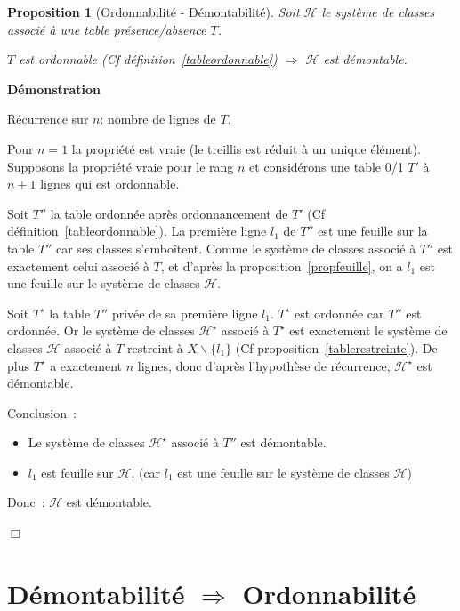 \documentclass[a4paper]{report}
\renewcommand{\textbf}[1]{\begingroup\bfseries\mathversion{bold}#1\endgroup}
\newtheorem{proposition}{Proposition}[chapter]
\newenvironment{preuve}{\textbf{Démonstration}}{}
\begin{document}
\label{sens2}


\begin{proposition}[Ordonnabilité - Démontabilité]

\label{tabletreillis}
Soit $\mathcal{H}$ le système de classes associé à une table présence/absence $T$.

$T$ est ordonnable (Cf définition~\ref{tableordonnable}) $\Rightarrow$ $\mathcal{H}$ est démontable. 

\end{proposition}

\begin{preuve}

Récurrence sur $n$: nombre de lignes de $T$.

Pour $n = 1$  la propriété est vraie (le treillis est réduit à un unique élément).
Supposons la propriété vraie pour le rang $n$ et considérons une table 0/1 $T'$ à $n + 1$ lignes qui est ordonnable.

Soit $T''$ la table ordonnée après ordonnancement de $T'$ (Cf définition~\ref{tableordonnable}).
La première ligne $l_1$ de $T''$ est une feuille sur la table $T''$ car ses classes s'emboîtent. 
Comme le système de classes associé à $T''$ est exactement celui associé à $T$, et 
d'après la proposition~\ref{propfeuille}, on a $l_1$ est une feuille sur le système de classes $\mathcal{H}$.

Soit $T^{\star}$ la table $T''$ privée de sa première ligne $l_1$.
$T^{\star}$ est ordonnée car $T''$ est ordonnée.
Or le système de classes  $\mathcal{H}^{\star}$ associé à $T^{\star}$ est exactement le système de 
classes $\mathcal{H}$ associé à $T$ restreint à $X \backslash \{l_1\}$ (Cf proposition~\ref{tablerestreinte}).
De plus $T^{\star}$ a exactement $n$ lignes, donc d'après l'hypothèse de
récurrence, $\mathcal{H}^{\star}$ est démontable.

Conclusion~:
\begin{itemize}
 \item Le système de classes $\mathcal{H}^{\star}$ associé à $T''$  est démontable. 
 \item $l_1$ est feuille sur $\mathcal{H}$. (car  $l_1$ est une feuille sur le système de classes $\mathcal{H}$)
\end{itemize}
Donc~: $\mathcal{H}$ est démontable.

$\Box$
\end{preuve}

\section{Démontabilité $\Rightarrow$ Ordonnabilité}
\end{document}
